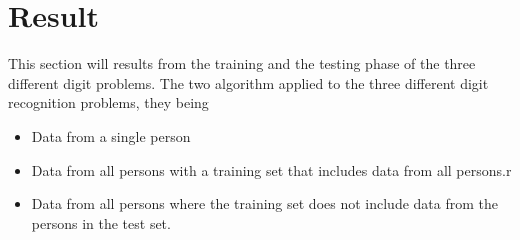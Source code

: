 \section{Result}
\label{sec::result}
This section will results from the training and the testing phase of the three different digit problems.  The two 
algorithm applied to the three different digit recognition problems, they 
being 
\begin{itemize}
\item	Data from a single person
\item	Data from all persons with a training set that includes data from all 
persons.r
\item Data from all persons where the training set does not include data from 
the persons in the test set.
\end{itemize}

